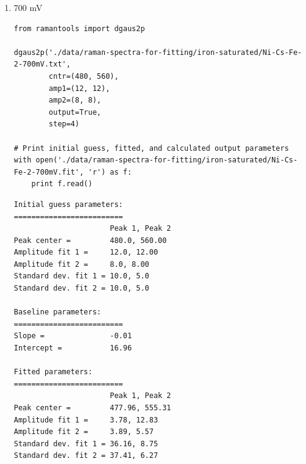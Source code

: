 \documentclass[journal=jpccck,manuscript=suppinfo,email=true]{achemso}
\begin{document}
\begin{enumerate}
\begin{enumerate}
\begin{enumerate}
\begin{verbatim}
Initial guess parameters:
=========================
                      Peak 1, Peak 2
Peak center =         480.0, 560.00
Amplitude fit 1 =     12.0, 12.00
Amplitude fit 2 =     8.0, 8.00
Standard dev. fit 1 = 10.0, 5.0
Standard dev. fit 2 = 10.0, 5.0

Baseline parameters:
=========================
Slope =               -0.01
Intercept =           19.77

Fitted parameters:
=========================
                      Peak 1, Peak 2
Peak center =         477.26, 555.66
Amplitude fit 1 =     4.08, 14.96
Amplitude fit 2 =     4.95, 4.44
Standard dev. fit 1 = 34.30, 7.64
Standard dev. fit 2 = 30.90, 5.62

Calculation output:
========================
Mean peak 1 =         477.3 $\pm$ 0.30
Mean peak 2 =         555.7 $\pm$ 0.82
Height peak 1 =       34.4 $\pm$ 0.42
Height peak 2 =       24.1 $\pm$ 0.47
Area peak 1 =         901.1
Area peak 2 =         630.3
\end{verbatim}

\item 700 mV
\label{sec-4-2-0-2-2-2}
\begin{verbatim}
from ramantools import dgaus2p

dgaus2p('./data/raman-spectra-for-fitting/iron-saturated/Ni-Cs-Fe-2-700mV.txt',
        cntr=(480, 560),
        amp1=(12, 12),
        amp2=(8, 8),
        output=True,
        step=4)

# Print initial guess, fitted, and calculated output parameters
with open('./data/raman-spectra-for-fitting/iron-saturated/Ni-Cs-Fe-2-700mV.fit', 'r') as f:
    print f.read()
\end{verbatim}

\begin{verbatim}
Initial guess parameters:
=========================
                      Peak 1, Peak 2
Peak center =         480.0, 560.00
Amplitude fit 1 =     12.0, 12.00
Amplitude fit 2 =     8.0, 8.00
Standard dev. fit 1 = 10.0, 5.0
Standard dev. fit 2 = 10.0, 5.0

Baseline parameters:
=========================
Slope =               -0.01
Intercept =           16.96

Fitted parameters:
=========================
                      Peak 1, Peak 2
Peak center =         477.96, 555.31
Amplitude fit 1 =     3.78, 12.83
Amplitude fit 2 =     3.89, 5.57
Standard dev. fit 1 = 36.16, 8.75
Standard dev. fit 2 = 37.41, 6.27


\end{verbatim}
\end{enumerate}
\end{enumerate}
\end{enumerate}
\end{document}
